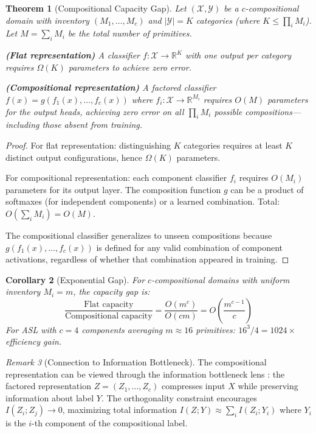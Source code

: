 \documentclass[sigconf,nonacm,anonymous]{acmart}
\newtheorem{theorem}{Theorem}[section]
\newtheorem{corollary}[theorem]{Corollary}
\theoremstyle{definition}
\theoremstyle{remark}
\newtheorem{remark}[theorem]{Remark}
\begin{document}
\begin{theorem}[Compositional Capacity Gap]
\label{thm:capacity_gap}
Let $(\mathcal{X}, \mathcal{Y})$ be a $c$-compositional domain with inventory $(M_1, \ldots, M_c)$ and $|\mathcal{Y}| = K$ categories (where $K \leq \prod_i M_i$). Let $M = \sum_i M_i$ be the total number of primitives.

\textbf{(Flat representation)} A classifier $f: \mathcal{X} \to \mathbb{R}^{K}$ with one output per category requires $\Omega(K)$ parameters to achieve zero error.

\textbf{(Compositional representation)} A factored classifier $f(x) = g(f_1(x), \ldots, f_c(x))$ where $f_i: \mathcal{X} \to \mathbb{R}^{M_i}$ requires $O(M)$ parameters for the output heads, achieving zero error on all $\prod_i M_i$ possible compositions---including those absent from training.
\end{theorem}

\begin{proof}
For flat representation: distinguishing $K$ categories requires at least $K$ distinct output configurations, hence $\Omega(K)$ parameters.

For compositional representation: each component classifier $f_i$ requires $O(M_i)$ parameters for its output layer. The composition function $g$ can be a product of softmaxes (for independent components) or a learned combination. Total: $O(\sum_i M_i) = O(M)$.

The compositional classifier generalizes to unseen compositions because $g(f_1(x), \ldots, f_c(x))$ is defined for any valid combination of component activations, regardless of whether that combination appeared in training.
\end{proof}

\begin{corollary}[Exponential Gap]
For $c$-compositional domains with uniform inventory $M_i = m$, the capacity gap is:
\begin{equation}
\frac{\text{Flat capacity}}{\text{Compositional capacity}} = \frac{O(m^c)}{O(cm)} = O\left(\frac{m^{c-1}}{c}\right)
\end{equation}
For ASL with $c=4$ components averaging $m \approx 16$ primitives: $16^3/4 = 1024\times$ efficiency gain.
\end{corollary}

\begin{remark}[Connection to Information Bottleneck]
The compositional representation can be viewed through the information bottleneck lens \cite{tishby2000information}: the factored representation $Z = (Z_1, \ldots, Z_c)$ compresses input $X$ while preserving information about label $Y$. The orthogonality constraint encourages $I(Z_i; Z_j) \to 0$, maximizing total information $I(Z; Y) \approx \sum_i I(Z_i; Y_i)$ where $Y_i$ is the $i$-th component of the compositional label.
\end{remark}
\end{document}
